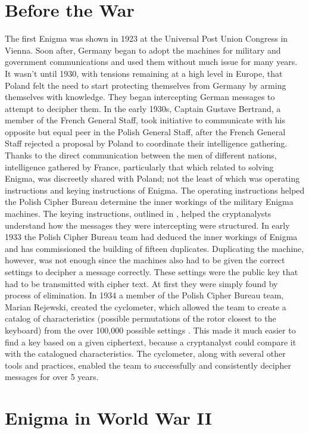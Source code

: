\section{Before the War}

The first Enigma was shown in 1923 at the Universal Post Union Congress in Vienna. Soon after, Germany began to adopt the machines for military and government communications and used them without much issue for many years. It wasn’t until 1930, with tensions remaining at a high level in Europe, that Poland felt the need to start protecting themselves from Germany by arming themselves with knowledge. They began intercepting German messages to attempt to decipher them. In the early 1930s, Captain Gustave Bertrand, a member of the French General Staff, took initiative to communicate with his opposite but equal peer in the Polish General Staff, after the French General Staff rejected a proposal by Poland to coordinate their intelligence gathering. Thanks to the direct communication between the men of different nations, intelligence gathered by France, particularly that which related to solving Enigma, was discreetly shared with Poland; not the least of which was operating instructions and keying instructions of Enigma. The operating instructions helped the Polish Cipher Bureau determine the inner workings of the military Enigma machines. The keying instructions, outlined in , helped the cryptanalysts understand how the messages they were intercepting were structured. In early 1933 the Polish Cipher Bureau team had deduced the inner workings of Enigma and has commissioned the building of fifteen duplicates. Duplicating the machine, however, was not enough since the machines also had to be given the correct settings to decipher a message correctly. These settings were the public key that had to be transmitted with cipher text. At first they were simply found by process of elimination. In 1934 a member of the Polish Cipher Bureau team, Marian Rejewski, created the cyclometer, which allowed the team to create a catalog of characteristics (possible permutations of the rotor closest to the keyboard) from the over 100,000 possible settings \cite{rfc01}. This made it much easier to find a key based on a given ciphertext, because a cryptanalyst could compare it with the catalogued characteristics. The cyclometer, along with several other tools and practices, enabled the team to successfully and consistently decipher messages for over 5 years.

\section{Enigma in World War II}

